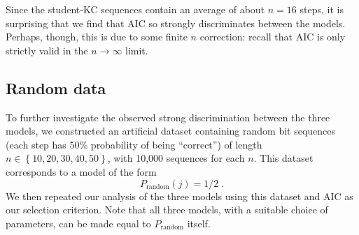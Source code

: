 \documentclass{edm_template}
\begin{document}
Since the student-KC sequences contain an average of about $n=16$ 
steps, it is surprising that we find that AIC so strongly
discriminates between the models.  Perhaps, though,  this is due to
some finite $n$ correction:  recall that AIC is only 
strictly valid in the $n\to\infty$ limit.

\subsection{Random data}


To further investigate the observed strong discrimination
between the three models, we constructed an
artificial dataset containing random bit sequences (each
step has 50\% probability of being ``correct'') of length 
$n\in\left\{10,20,30,40,50\right\}$, with 10,000 sequences for 
each $n$.
This dataset corresponds to a model of the form
%
\begin{equation}
        P_\mathrm{random}(j)=1/2 \; .
\end{equation}
%
We then repeated our analysis of the three models using this dataset
and AIC as our selection criterion.  Note that all three models,
with a suitable choice of parameters, can be made equal to 
$P_\mathrm{random}$ itself.
\end{document}

